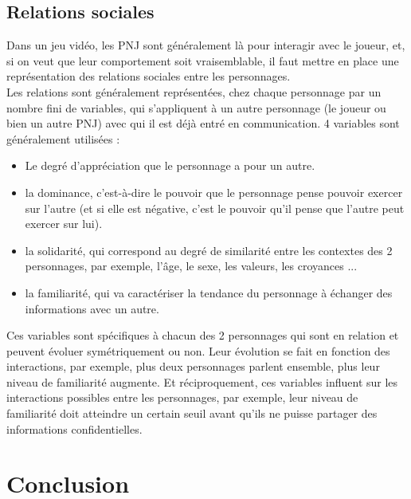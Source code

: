 \documentclass[asi]{picINSA}
\begin{document}
\section{Relations sociales}
Dans un jeu vidéo, les PNJ sont généralement là pour interagir avec le joueur, et, si on veut que leur comportement soit vraisemblable, il faut mettre en place une représentation des relations sociales entre les personnages. \\

Les relations sont généralement représentées, chez chaque personnage par un nombre fini de variables, qui s’appliquent à un autre personnage (le joueur ou bien un autre PNJ) avec qui il est déjà entré en communication. 4 variables sont généralement utilisées :
\begin{itemize}
\item Le degré d'appréciation que le personnage a pour un autre.
\item la dominance, c'est-à-dire le pouvoir que le personnage pense pouvoir exercer sur l'autre (et si elle est négative, c'est le pouvoir qu'il pense que l'autre peut exercer sur lui).
\item la solidarité, qui correspond au degré de similarité entre les contextes des 2 personnages, par exemple, l'âge, le sexe, les valeurs, les croyances ...
\item la familiarité, qui va caractériser la tendance du personnage à échanger des informations avec un autre.
\end{itemize}
Ces variables sont spécifiques à chacun des 2 personnages qui sont en relation et peuvent évoluer symétriquement ou non. Leur évolution se fait en fonction des interactions, par exemple, plus deux personnages parlent ensemble, plus leur niveau de familiarité augmente. Et réciproquement, ces variables influent sur les interactions possibles entre les personnages, par exemple, leur niveau de familiarité doit atteindre un certain seuil avant qu'ils ne puisse partager des informations confidentielles. 


\chapter{Conclusion}

  
\end{document}
